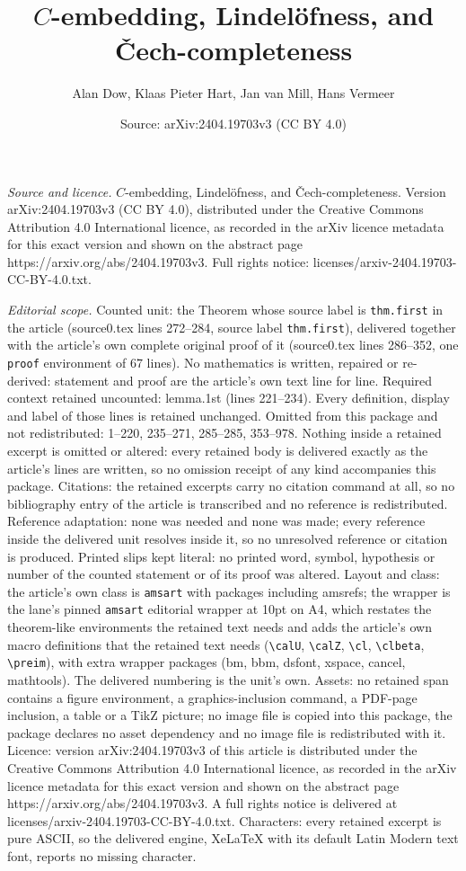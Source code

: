 \documentclass[10pt,a4paper]{amsart}
\title[$C$-embedding, Lindel\"ofness, and \v{C}ech-completeness]{$C$-embedding, Lindel\"ofness, and \v{C}ech-completeness}
\author{Alan Dow, Klaas Pieter Hart, Jan van Mill, Hans Vermeer}
\date{Source: arXiv:2404.19703v3 (CC BY 4.0)}
\begin{document}
\maketitle

\noindent\emph{Source and licence.} $C$-embedding, Lindel\"ofness, and \v{C}ech-completeness. Version arXiv:2404.19703v3 (CC BY 4.0), distributed under the Creative Commons Attribution 4.0 International licence, as recorded in the arXiv licence metadata for this exact version and shown on the abstract page https://arxiv.org/abs/2404.19703v3. Full rights notice: licenses/arxiv-2404.19703-CC-BY-4.0.txt.\par\smallskip

\noindent\textit{Editorial scope.} Counted unit: the Theorem whose source label is \texttt{thm.first} in the article (source0.tex lines 272--284, source label \texttt{thm.first}), delivered together with the article's own complete original proof of it (source0.tex lines 286--352, one \texttt{proof} environment of 67 lines). No mathematics is written, repaired or re-derived: statement and proof are the article's own text line for line. Required context retained uncounted: lemma.1st (lines 221--234). Every definition, display and label of those lines is retained unchanged. Omitted from this package and not redistributed: 1--220, 235--271, 285--285, 353--978. Nothing inside a retained excerpt is omitted or altered: every retained body is delivered exactly as the article's lines are written, so no omission receipt of any kind accompanies this package. Citations: the retained excerpts carry no citation command at all, so no bibliography entry of the article is transcribed and no reference is redistributed. Reference adaptation: none was needed and none was made; every reference inside the delivered unit resolves inside it, so no unresolved reference or citation is produced. Printed slips kept literal: no printed word, symbol, hypothesis or number of the counted statement or of its proof was altered. Layout and class: the article's own class is \texttt{amsart} with packages including amsrefs; the wrapper is the lane's pinned \texttt{amsart} editorial wrapper at 10pt on A4, which restates the theorem-like environments the retained text needs and adds the article's own macro definitions that the retained text needs (\texttt{\textbackslash calU}, \texttt{\textbackslash calZ}, \texttt{\textbackslash cl}, \texttt{\textbackslash clbeta}, \texttt{\textbackslash preim}), with extra wrapper packages (bm, bbm, dsfont, xspace, cancel, mathtools). The delivered numbering is the unit's own. Assets: no retained span contains a figure environment, a graphics-inclusion command, a PDF-page inclusion, a table or a TikZ picture; no image file is copied into this package, the package declares no asset dependency and no image file is redistributed with it. Licence: version arXiv:2404.19703v3 of this article is distributed under the Creative Commons Attribution 4.0 International licence, as recorded in the arXiv licence metadata for this exact version and shown on the abstract page https://arxiv.org/abs/2404.19703v3. A full rights notice is delivered at licenses/arxiv-2404.19703-CC-BY-4.0.txt. Characters: every retained excerpt is pure ASCII, so the delivered engine, XeLaTeX with its default Latin Modern text font, reports no missing character.
\end{document}
